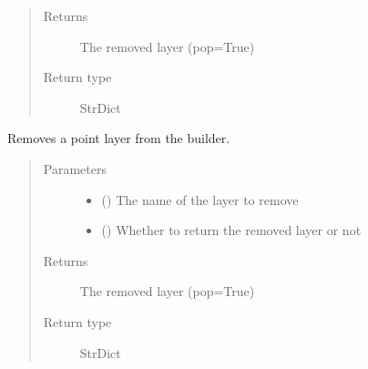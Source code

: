 \documentclass[letterpaper,10pt,english]{sphinxmanual}
\begin{document}
\begin{fulllineitems}
\begin{fulllineitems}
\begin{quote}
\begin{description}
\begin{itemize}
\end{itemize}

\item[{Returns}] \leavevmode
\sphinxAtStartPar
The removed layer (pop=True)

\item[{Return type}] \leavevmode
\sphinxAtStartPar
StrDict

\end{description}\end{quote}

\end{fulllineitems}


\begin{fulllineitems}
\label{\detokenize{builder:geohexviz.builder.PlotBuilder.remove_point}}
\sphinxAtStartPar
Removes a point layer from the builder.
\begin{quote}\begin{description}
\item[{Parameters}] \leavevmode\begin{itemize}
\item {} 
\sphinxAtStartPar
{} () \textendash{} The name of the layer to remove

\item {} 
\sphinxAtStartPar
{} () \textendash{} Whether to return the removed layer or not

\end{itemize}

\item[{Returns}] \leavevmode
\sphinxAtStartPar
The removed layer (pop=True)

\item[{Return type}] \leavevmode
\sphinxAtStartPar
StrDict

\end{description}\end{quote}


\end{fulllineitems}
\end{fulllineitems}
\end{document}
